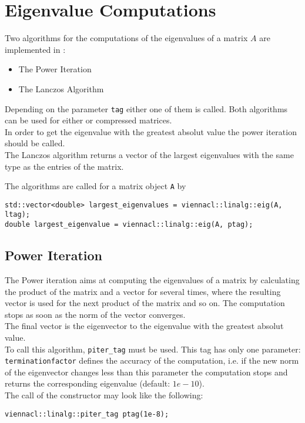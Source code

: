 \section{Eigenvalue Computations}
Two algorithms for the computations of the eigenvalues of a matrix $A$ are implemented in {\ViennaCL}:
\begin{itemize}
\item The Power Iteration \cite{golub:matrix-computations}
\item The Lanczos Algorithm \cite{simon:lanczos-pro}
\end{itemize}
Depending on the parameter \lstinline|tag| either one of them is called.
Both algorithms can be used for either {\ublas} or {\ViennaCL} compressed matrices.\\
In order to get the eigenvalue with the greatest absolut value the power iteration should be called. \\
The Lanczos algorithm returns a vector of the largest eigenvalues with the same type as the entries of the matrix.

The algorithms are called for a matrix object \lstinline|A| by
\begin{lstlisting}
std::vector<double> largest_eigenvalues = viennacl::linalg::eig(A, ltag);
double largest_eigenvalue = viennacl::linalg::eig(A, ptag);
\end{lstlisting}


\subsection{Power Iteration}
The Power iteration aims at computing the eigenvalues of a matrix by calculating the product of the matrix and a vector for several times, where the resulting vector is used for the next product of the matrix and so on. The computation stops as soon as the norm of the vector converges. \\
The final vector is the eigenvector to the eigenvalue with the greatest absolut value.\\
To call this algorithm, \lstinline|piter_tag| must be used.
This tag has only one parameter: \\ \lstinline|terminationfactor| defines the accuracy of the computation, i.e. if the new norm of the eigenvector changes less than this parameter the computation stops and returns the corresponding eigenvalue (default: $1e-10$).\\
The call of the constructor may look like the following:
\begin{lstlisting}
viennacl::linalg::piter_tag ptag(1e-8);
\end{lstlisting}

